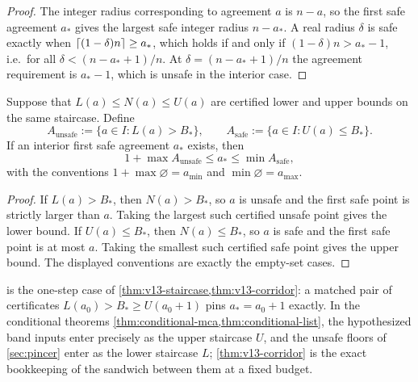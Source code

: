 \begin{proof}
The integer radius corresponding to agreement $a$ is $n-a$, so the first safe agreement $a_*$ gives the largest safe integer radius $n-a_*$.  A real radius $\delta$ is safe exactly when $\left\lceil (1-\delta)n\right\rceil\ge a_*$, which holds if and only if $(1-\delta)n>a_*-1$, i.e.\ for all $\delta<(n-a_*+1)/n$.  At $\delta=(n-a_*+1)/n$ the agreement requirement is $a_*-1$, which is unsafe in the interior case.
\end{proof}

\begin{theorem}\label{thm:v13-corridor}
Suppose that $L(a)\le N(a)\le U(a)$ are certified lower and upper bounds on the same staircase.  Define
\[
        A_{\mathrm{unsafe}}:=\{a\in I:L(a)>B_*\},
        \qquad
        A_{\mathrm{safe}}:=\{a\in I:U(a)\le B_*\}.
\]
If an interior first safe agreement $a_*$ exists, then
\[
        1+\max A_{\mathrm{unsafe}}\le a_*\le \min A_{\mathrm{safe}},
\]
with the conventions $1+\max\varnothing=a_{\min}$ and $\min\varnothing=a_{\max}$.
\end{theorem}

\begin{proof}
If $L(a)>B_*$, then $N(a)>B_*$, so $a$ is unsafe and the first safe point is strictly larger than $a$.  Taking the largest such certified unsafe point gives the lower bound.  If $U(a)\le B_*$, then $N(a)\le B_*$, so $a$ is safe and the first safe point is at most $a$.  Taking the smallest such certified safe point gives the upper bound.  The displayed conventions are exactly the empty-set cases.
\end{proof}

\begin{remark}\label{rem:v13-staircase-v12}
 is the one-step case of \cref{thm:v13-staircase,thm:v13-corridor}: a matched pair of certificates $L(a_0)>B_*\ge U(a_0+1)$ pins $a_*=a_0+1$ exactly.  In the conditional theorems \cref{thm:conditional-mca,thm:conditional-list}, the hypothesized band inputs enter precisely as the upper staircase $U$, and the unsafe floors of \cref{sec:pincer} enter as the lower staircase $L$; \cref{thm:v13-corridor} is the exact bookkeeping of the sandwich between them at a fixed budget.
\end{remark}

